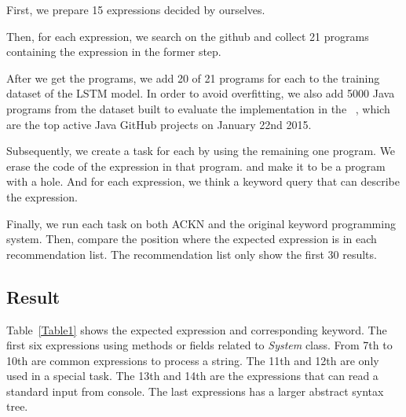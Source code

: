 \documentclass[PRO,english]{ipsj}
\begin{document}
First, we prepare 15 expressions decided by ourselves. 

Then, for each expression, we search on the github and collect 21 programs containing the expression in the former step.

After we get the programs, we add 20 of 21 programs for each to the training dataset of the LSTM model. In order to avoid overfitting, we also add 5000 Java programs from the dataset built to evaluate the implementation in the ~\cite{allamanis2015suggesting}, which are the top active Java GitHub projects on January 22nd 2015.

Subsequently, we create a task for each by using the remaining one program. We erase the code of the expression in that program. and make it to be a program with a hole. And for each expression, we think a keyword query that can describe the expression. 

Finally, we run each task on both ACKN and the original keyword programming system. Then, compare the position where the expected expression is in each recommendation list. The recommendation list only show the first 30 results.

\subsection{Result}
Table~\ref{Table1} shows the expected expression and corresponding keyword. The first six expressions using methods or fields related to \textit{System} class. From 7th to 10th are common expressions to process a string. The 11th and 12th are only used in a special task. The 13th and 14th are the expressions that can read a standard input from console. The last expressions has a larger abstract syntax tree.
\end{document}
